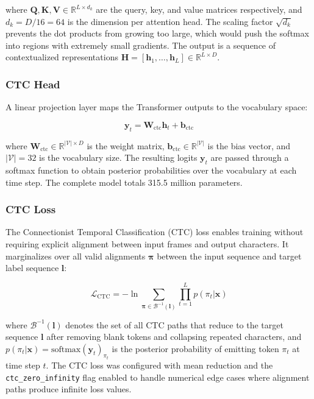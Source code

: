 \documentclass[conference]{IEEEtran}
\begin{document}
\noindent where $\mathbf{Q}, \mathbf{K}, \mathbf{V} \in \mathbb{R}^{L \times d_k}$ are the query, key, and value matrices respectively, and $d_k = D/16 = 64$ is the dimension per attention head. The scaling factor $\sqrt{d_k}$ prevents the dot products from growing too large, which would push the softmax into regions with extremely small gradients. The output is a sequence of contextualized representations $\mathbf{H} = [\mathbf{h}_1, \ldots, \mathbf{h}_L] \in \mathbb{R}^{L \times D}$.

\subsubsection{CTC Head}
A linear projection layer maps the Transformer outputs to the vocabulary space:

\begin{equation}
\mathbf{y}_t = \mathbf{W}_{\text{ctc}} \mathbf{h}_t + \mathbf{b}_{\text{ctc}}
\label{eq:ctc_head}
\end{equation}

\noindent where $\mathbf{W}_{\text{ctc}} \in \mathbb{R}^{|\mathcal{V}| \times D}$ is the weight matrix, $\mathbf{b}_{\text{ctc}} \in \mathbb{R}^{|\mathcal{V}|}$ is the bias vector, and $|\mathcal{V}| = 32$ is the vocabulary size. The resulting logits $\mathbf{y}_t$ are passed through a softmax function to obtain posterior probabilities over the vocabulary at each time step. The complete model totals 315.5 million parameters.

\subsubsection{CTC Loss}
The Connectionist Temporal Classification (CTC) loss \cite{b12} enables training without requiring explicit alignment between input frames and output characters. It marginalizes over all valid alignments $\boldsymbol{\pi}$ between the input sequence and target label sequence $\mathbf{l}$:

\begin{equation}
\mathcal{L}_{\text{CTC}} = -\ln \sum_{\boldsymbol{\pi} \in \mathcal{B}^{-1}(\mathbf{l})} \prod_{t=1}^{L} p(\pi_t | \mathbf{x})
\label{eq:ctc_loss}
\end{equation}

\noindent where $\mathcal{B}^{-1}(\mathbf{l})$ denotes the set of all CTC paths that reduce to the target sequence $\mathbf{l}$ after removing blank tokens and collapsing repeated characters, and $p(\pi_t | \mathbf{x}) = \text{softmax}(\mathbf{y}_t)_{\pi_t}$ is the posterior probability of emitting token $\pi_t$ at time step $t$. The CTC loss was configured with mean reduction and the \texttt{ctc\_zero\_infinity} flag enabled to handle numerical edge cases where alignment paths produce infinite loss values.
\end{document}
